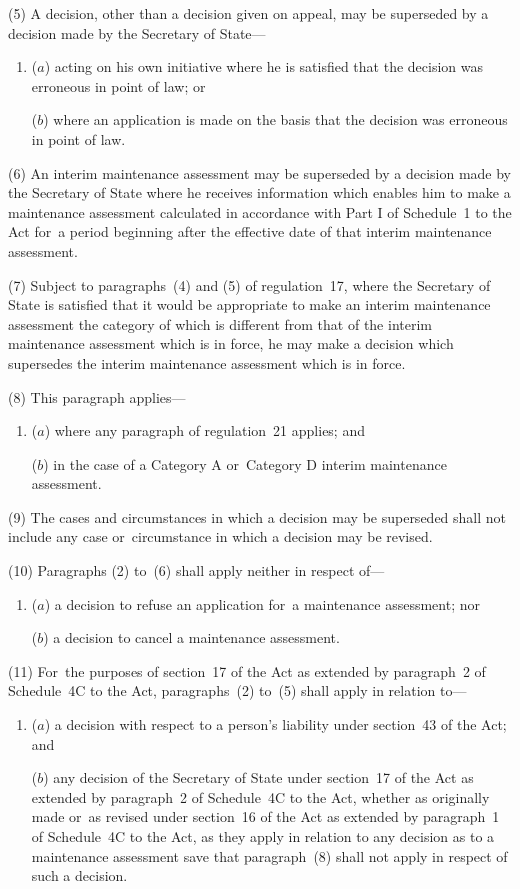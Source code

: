 \documentclass[a4paper,12pt]{article}
\begin{document}
(5) A decision, other than a decision given on appeal, may be superseded by a decision made by the Secretary of State---
\begin{enumerate}\item[]
($a$) acting on his own initiative where he is satisfied that the decision was erroneous in point of law; or

($b$) where an application is made on the basis that the decision was erroneous in point of law.
\end{enumerate}

(6) An interim maintenance assessment may be superseded by a decision made by the Secretary of State where he receives information which enables him to make a maintenance assessment calculated in accordance with Part I of Schedule~1 to the Act for~a period beginning after the effective date of that interim maintenance assessment.

(7) Subject to paragraphs~(4) and (5) of regulation~17, where the Secretary of State is satisfied that it would be appropriate to make an interim maintenance assessment the category of which is different from that of the interim maintenance assessment which is in force, he may make a decision which supersedes the interim maintenance assessment which is in force.

(8) This paragraph applies---
\begin{enumerate}\item[]
($a$) where any paragraph of regulation~21 applies; and

($b$) in the case of a Category A or~Category D interim maintenance assessment.
\end{enumerate}

(9) The cases and circumstances in which a decision may be superseded shall not include any case or~circumstance in which a decision may be revised.

(10) Paragraphs (2) to~(6) shall apply neither in respect of---
\begin{enumerate}\item[]
($a$) a decision to refuse an application for~a maintenance assessment; nor

($b$) a decision to cancel a maintenance assessment.
\end{enumerate}

(11) For~the purposes of section~17 of the Act as extended by paragraph~2 of Schedule~4C to the Act, paragraphs~(2) to~(5) shall apply in relation to---
\begin{enumerate}\item[]
($a$) a decision with respect to 
a person’s liability under section~43 of the Act; and

($b$) any decision of the Secretary of State under section~17 of the Act as extended by paragraph~2 of Schedule~4C to the Act, whether as originally made or~as revised under section~16 of the Act as extended by paragraph~1 of Schedule~4C to the Act, as they apply in relation to any decision as to a maintenance assessment save that paragraph~(8) shall not apply in respect of such a decision.
\end{enumerate}
\end{document}
